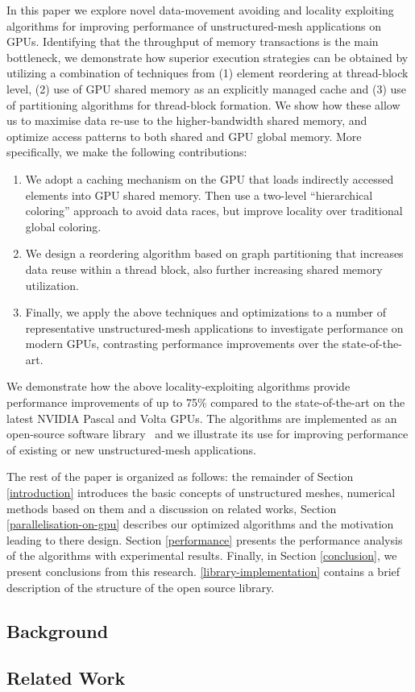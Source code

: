 In this paper we explore novel data-movement avoiding and locality exploiting 
algorithms for improving performance of unstructured-mesh applications on GPUs. 
Identifying that the throughput of memory transactions is the main bottleneck, 
we demonstrate how superior execution strategies can be obtained by utilizing 
a combination of techniques from (1) element reordering at thread-block level, 
(2) use of GPU shared memory as an explicitly managed cache and (3) use of 
partitioning algorithms for thread-block formation. We show how these allow us 
to maximise data re-use to the higher-bandwidth shared memory, and optimize 
access patterns to both shared and GPU global memory. More specifically, we make 
the following contributions:
\begin{enumerate}
\item We adopt a caching mechanism on the GPU that loads indirectly accessed 
elements into GPU shared memory. Then use a two-level ``hierarchical coloring'' 
approach to avoid data races, but improve locality over traditional global 
coloring. 

\item We design a reordering algorithm based on graph partitioning that 
increases data reuse within a thread block, also further increasing shared 
memory utilization. 

\item Finally, we apply the above techniques and optimizations to a number of 
representative unstructured-mesh applications to investigate performance on 
modern GPUs, contrasting performance improvements over the state-of-the-art. 
\end{enumerate}

\noindent We demonstrate how the above locality-exploiting algorithms provide 
performance improvements of up to 75\% compared to the state-of-the-art on the 
latest NVIDIA Pascal and Volta GPUs. The algorithms are implemented as an 
open-source software library~\cite{opt-library} and we illustrate 
its use for improving performance of existing or new unstructured-mesh 
applications.

The rest of the paper is organized as follows: the remainder of Section
\ref{introduction} introduces the basic concepts of unstructured meshes, 
numerical methods based on them and a discussion on related works, Section 
\ref{parallelisation-on-gpu} describes our optimized algorithms and the 
motivation leading to there design. Section \ref{performance} presents the 
performance analysis of the algorithms with experimental results. Finally, in 
Section \ref{conclusion}, we present conclusions from this research. 
\ref{library-implementation} contains a brief description of the structure of 
the open source library.


\subsection{Background}\label{sec:background}


\subsection{Related Work}\label{sec:related-works}


